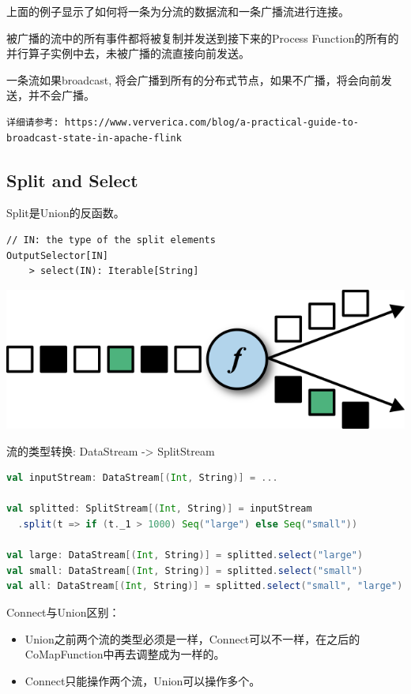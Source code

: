 \documentclass[oneside]{ctexbook}
\begin{document}
上面的例子显示了如何将一条为分流的数据流和一条广播流进行连接。

被广播的流中的所有事件都将被复制并发送到接下来的Process Function的所有的并行算子实例中去，未被广播的流直接向前发送。

一条流如果broadcast, 将会广播到所有的分布式节点，如果不广播，将会向前发送，并不会广播。

\begin{lstlisting}
详细请参考: https://www.ververica.com/blog/a-practical-guide-to-broadcast-state-in-apache-flink
\end{lstlisting}

\subsection{Split and Select}

Split是Union的反函数。

\begin{lstlisting}
// IN: the type of the split elements
OutputSelector[IN]
    > select(IN): Iterable[String]
\end{lstlisting}

\noindent \includegraphics[width=\textwidth]{split.png}

流的类型转换: DataStream -> SplitStream

\begin{lstlisting}[language=scala, breaklines]
val inputStream: DataStream[(Int, String)] = ...

val splitted: SplitStream[(Int, String)] = inputStream
  .split(t => if (t._1 > 1000) Seq("large") else Seq("small"))

val large: DataStream[(Int, String)] = splitted.select("large")
val small: DataStream[(Int, String)] = splitted.select("small")
val all: DataStream[(Int, String)] = splitted.select("small", "large")
\end{lstlisting}

Connect与Union区别：
\begin{itemize}
\item Union之前两个流的类型必须是一样，Connect可以不一样，在之后的CoMapFunction中再去调整成为一样的。
\item Connect只能操作两个流，Union可以操作多个。
\end{itemize}
\end{document}
